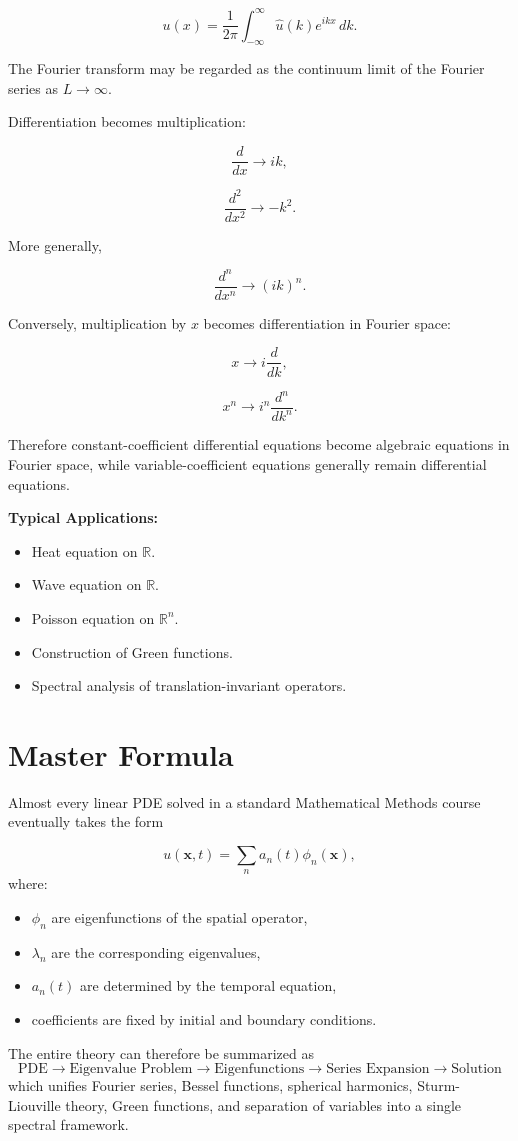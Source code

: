 \documentclass[aps,prl,twocolumn,groupedaddress]{revtex4-2}
\begin{document}
$$
u(x)
=
\frac{1}{2\pi}
\int_{-\infty}^{\infty}
\hat u(k)e^{ikx}\,dk.
$$

The Fourier transform may be regarded as the continuum limit of the Fourier series as $L\to\infty$.

Differentiation becomes multiplication:

$$
\frac{d}{dx}
\longrightarrow
ik,
$$

$$
\frac{d^2}{dx^2}
\longrightarrow
-k^2.
$$

More generally,

$$
\frac{d^n}{dx^n}
\longrightarrow
(ik)^n.
$$

Conversely, multiplication by $x$ becomes differentiation in Fourier space:

$$
x
\longrightarrow
i\frac{d}{dk},
$$

$$
x^n
\longrightarrow
i^n\frac{d^n}{dk^n}.
$$

Therefore constant-coefficient differential equations become algebraic equations in Fourier space, while variable-coefficient equations generally remain differential equations.

\vspace{0.5cm}
{\bf Typical Applications:}
\begin{itemize}
\item Heat equation on $\mathbb R$.
\item Wave equation on $\mathbb R$.
\item Poisson equation on $\mathbb R^n$.
\item Construction of Green functions.
\item Spectral analysis of translation-invariant operators.
\end{itemize}

\section{Master Formula}

Almost every linear PDE solved in a standard Mathematical Methods course eventually takes the form

$$
u(\mathbf x,t)
=
\sum_n
a_n(t)\phi_n(\mathbf x),
$$
where:
\begin{itemize}
\item $\phi_n$ are eigenfunctions of the spatial operator,
\item $\lambda_n$ are the corresponding eigenvalues,
\item $a_n(t)$ are determined by the temporal equation,
\item coefficients are fixed by initial and boundary conditions.
\end{itemize}
The entire theory can therefore be summarized as
$$
\boxed{
\text{PDE}
\longrightarrow
\text{Eigenvalue Problem}
\longrightarrow
\text{Eigenfunctions}
\longrightarrow
\text{Series Expansion}
\longrightarrow
\text{Solution}
}
$$
which unifies Fourier series, Bessel functions, spherical harmonics, Sturm-Liouville theory, Green functions, and separation of variables into a single spectral framework.
\end{document}
